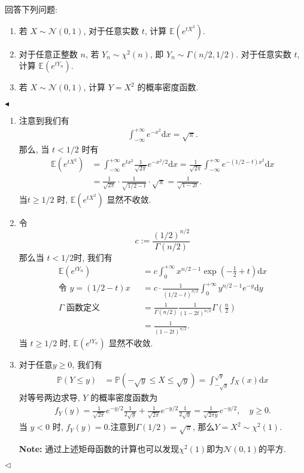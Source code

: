 \documentclass[11pt]{article}
\newenvironment{problem}[2][Problem]{\begin{trivlist}
    \item[\hskip \labelsep {\bfseries #1}\hskip \labelsep {\bfseries #2.}]\songti}{\hfill$\blacktriangleleft$\end{trivlist}}
\newenvironment{answer}[1][Solution]{\begin{trivlist}
    \item[\hskip \labelsep {\bfseries #1.}\hskip \labelsep]}{\hfill$\lhd$\end{trivlist}}
\newcommand\1{\mathds{1}}
\newcommand\E{\mathbb{E}}
\newcommand\NN{\mathcal{N}}
\newcommand\PP{\mathbb{P}}
\newcommand\dd{\mathrm{d}}
\begin{document}
\begin{problem}{6}
    回答下列问题:
    \begin{enumerate}[label=(\arabic*)]
        \item 若 $X\sim \NN(0,1)$, 对于任意实数 $t$, 计算 $\E\left(e^{tX^2}\right)$.
        \item 对于任意正整数 $n$, 若 $Y_n \sim \chi^2(n)$, 即 $Y_n \sim \Gamma(n/2, 1/2)$. 对于任意实数 $t$, 计算 $\E\left(e^{tY_n}\right)$.
        \item 若 $X\sim \NN(0,1)$, 计算 $Y = X^2$ 的概率密度函数.
    \end{enumerate}
\end{problem}
\begin{answer}
    \begin{enumerate}[label=(\arabic*)]
        \item 注意到我们有
        \begin{align*}
            \int_{-\infty}^{+\infty} e^{-x^2}\dd x = \sqrt{\pi}.
        \end{align*}
        那么, 当 $t < 1/2$ 时有
        \begin{align*}
            \E\left(e^{tX^2}\right) &= \int_{-\infty}^{+\infty} e^{tx^2} \frac{1}{\sqrt{2\pi}} e^{-x^2/2} \dd x = \frac{1}{\sqrt{2\pi}}\int_{-\infty}^{+\infty} e^{-(1/2 - t)x^2} \dd x \\
            &= \frac{1}{\sqrt{2\pi}} \cdot\frac{1}{\sqrt{1/2 - t}} \cdot \sqrt{\pi} = \frac{1}{\sqrt{1-2t}}.
        \end{align*}
        当$t \ge 1/2$ 时, $\E\left(e^{tX^2}\right)$ 显然不收敛. 
        \item 令 \[c := \frac{(1/2)^{n/2}}{\Gamma(n/2)}\] 那么当 $t<1/2$时, 我们有
        \begin{align*}
            \E\left(e^{tY_n}\right) & = c \int_{0}^{+\infty} x^{n/2-1} \exp\left(-\frac{1}{2} + t\right) \dd x \\
            \text{令 $y = (1/2 -t)x$ }&= c\cdot \frac{1}{(1/2 - t)^{n/2}} \int_{0}^{+\infty} y^{n/2 - 1} e^{-y} \dd y \\
            \text{$\Gamma$ 函数定义 }&= \frac{1}{\Gamma(n/2)} \frac{1}{(1-2t)^{n/2}} \Gamma\left(\frac{n}{2}\right) \\
            &= \frac{1}{(1-2t)^{n/2}}.
        \end{align*}
        当  $t\ge 1/2$ 时, $\E\left(e^{tY_n}\right)$ 显然不收敛.
        \item 对于任意$y\ge 0$, 我们有
        \begin{align*}
            \PP(Y\le y) &= \PP(-\sqrt{y}\le X\le \sqrt{y}) = \int_{-\sqrt{y}}^{\sqrt{y}} f_X(x) \dd x 
        \end{align*}
        对等号两边求导, $Y$ 的概率密度函数为
        \begin{align*}
            f_Y(y) = \frac{1}{\sqrt{2\pi}}e^{-y/2}\frac{1}{2\sqrt{y}} + \frac{1}{\sqrt{2\pi}}e^{-y/2}\frac{1}{2\sqrt{y}} = \frac{1}{\sqrt{2\pi y}} e^{-y/2}, \quad y\ge 0.
        \end{align*}
        当 $y<0$ 时, $f_Y(y) = 0$.注意到$\Gamma(1/2) = \sqrt{\pi}$, 那么$Y = X^2\sim \chi^2(1)$.

        \textbf{Note: } 通过上述矩母函数的计算也可以发现$\chi^2(1)$即为$\NN(0,1)$的平方.
    \end{enumerate}
\end{answer}
\end{document}

